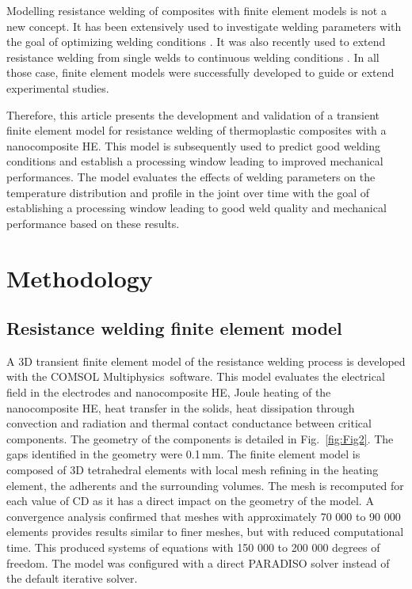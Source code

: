 \documentclass[review,times,sagev,doublespace]{sagej}
\begin{document}
{
Modelling resistance welding of composites with finite element models is not a new concept. 
It has been extensively used to investigate welding parameters \cite{Mijovic1989,Ageorges2001,Ageorges2001b} with the goal of optimizing welding conditions \cite{Colak2002}. 
It was also recently used to extend resistance welding from single welds to continuous welding conditions \cite{Shi2015a}. 
In all those case, finite element models were successfully developed to guide or extend experimental studies. 
}

Therefore, this article presents the development and validation of a transient finite element model for resistance welding of thermoplastic composites with a nanocomposite HE. 
This model is subsequently used to predict good welding conditions and establish a processing window leading to improved mechanical performances. 
{
The model evaluates the effects of welding parameters on the temperature distribution and profile in the joint over time with the goal of establishing a processing window leading to good weld quality and mechanical performance based on these results. 
}

\section{Methodology}

	\subsection{Resistance welding finite element model}

A {3D} transient finite element model of the resistance welding process is developed with the COMSOL Multiphysics\textregistered \ software. 
This model evaluates the electrical field in the electrodes and nanocomposite HE, {J}oule heating of the nanocomposite HE, heat transfer in the solids, heat dissipation through convection and radiation and thermal contact conductance between critical components. 
The geometry of the components is detailed in Fig.~\ref{fig:Fig2}. 
The gaps identified in the geometry were \mbox{0.1\,mm}. 
{
The finite element model is composed of 3D tetrahedral elements with local mesh refining in the heating element, the adherents and the surrounding volumes. 
The mesh is recomputed for each value of CD as it has a direct impact on the geometry of the model.
A convergence analysis confirmed that meshes with approximately 70 000 to 90 000 elements provides results similar to finer meshes, but with reduced computational time. 
This produced systems of equations with 150 000 to 200 000 degrees of freedom. 
The model was configured with a direct PARADISO solver instead of the default iterative solver. 
}
\end{document}
